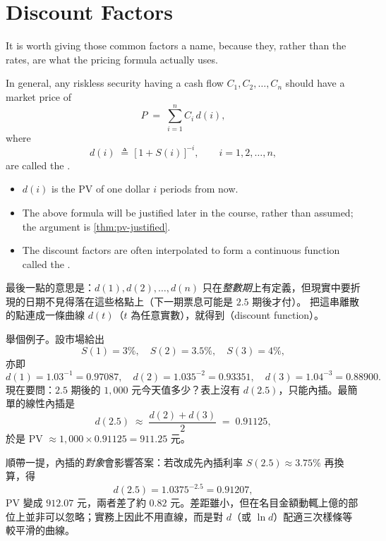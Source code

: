 \section{Discount Factors}


It is worth giving those common factors a name, because they, rather than the rates, are what the pricing formula actually uses.

\begin{definition}
	In general, any riskless security having a cash flow $C_{1},C_{2},\ldots,C_{n}$ should have a market price of
	\begin{equation}
		P \;=\; \sum_{i=1}^{n} C_{i}\,d(i) , \label{eq:price-df}
	\end{equation}
	where
	\[
		d(i) \;\triangleq\; \bigl[\,1+S(i)\,\bigr]^{-i} , \qquad i=1,2,\ldots,n ,
	\]
	are called the .
\end{definition}

\begin{itemize}[nosep]
	\item $d(i)$ is the PV of one dollar $i$ periods from now.
	\item The above formula will be justified later in the course, rather than assumed; the argument is \autoref{thm:pv-justified}.
	\item The discount factors are often interpolated to form a continuous function called the .
\end{itemize}

\suppstart
\begin{note}
	最後一點的意思是：$d(1),d(2),\ldots,d(n)$ 只在\emph{整數期}上有定義，但現實中要折現的日期不見得落在這些格點上（下一期票息可能是 $2.5$ 期後才付）。
	把這串離散的點連成一條曲線 $d(t)$（$t$ 為任意實數），就得到（discount function）。

	舉個例子。設市場給出
	\[
		S(1)=3\%,\quad S(2)=3.5\%,\quad S(3)=4\% ,
	\]
	亦即
	\[
		d(1)=1.03^{-1}=0.97087,\quad
		d(2)=1.035^{-2}=0.93351,\quad
		d(3)=1.04^{-3}=0.88900 .
	\]
	現在要問：$2.5$ 期後的 $1{,}000$ 元今天值多少？表上沒有 $d(2.5)$，只能內插。最簡單的線性內插是
	\[
		d(2.5) \;\approx\; \frac{d(2)+d(3)}{2} \;=\; 0.91125 ,
	\]
	於是 PV $\approx 1{,}000 \times 0.91125 = 911.25$ 元。

	順帶一提，內插的\emph{對象}會影響答案：若改成先內插利率 $S(2.5) \approx 3.75\%$ 再換算，得
	\[
		d(2.5) = 1.0375^{-2.5} = 0.91207 ,
	\]
	PV 變成 $912.07$ 元，兩者差了約 $0.82$ 元。差距雖小，但在名目金額動輒上億的部位上並非可以忽略；實務上因此不用直線，而是對 $d$（或 $\ln d$）配適三次樣條等較平滑的曲線。
\end{note}

